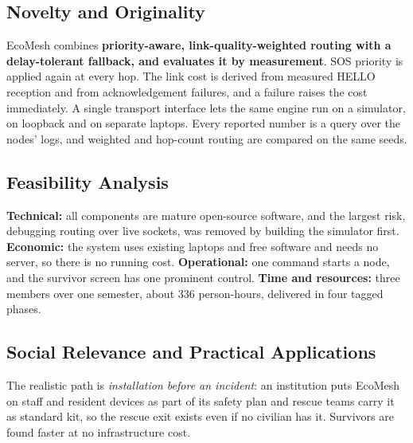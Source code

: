 \subsection{Novelty and Originality}
EcoMesh combines \textbf{priority-aware, link-quality-weighted routing with a delay-tolerant fallback, and evaluates it by measurement}. SOS priority is applied again at every hop. The link cost is derived from measured HELLO reception and from acknowledgement failures, and a failure raises the cost immediately. A single transport interface lets the same engine run on a simulator, on loopback and on separate laptops. Every reported number is a query over the nodes' logs, and weighted and hop-count routing are compared on the same seeds.

\subsection{Feasibility Analysis}
\textbf{Technical:} all components are mature open-source software, and the largest risk, debugging routing over live sockets, was removed by building the simulator first. \textbf{Economic:} the system uses existing laptops and free software and needs no server, so there is no running cost. \textbf{Operational:} one command starts a node, and the survivor screen has one prominent control. \textbf{Time and resources:} three members over one semester, about 336 person-hours, delivered in four tagged phases.

\subsection{Social Relevance and Practical Applications}
The realistic path is \emph{installation before an incident}: an institution puts EcoMesh on staff and resident devices as part of its safety plan and rescue teams carry it as standard kit, so the rescue exit exists even if no civilian has it. Survivors are found faster at no infrastructure cost.

